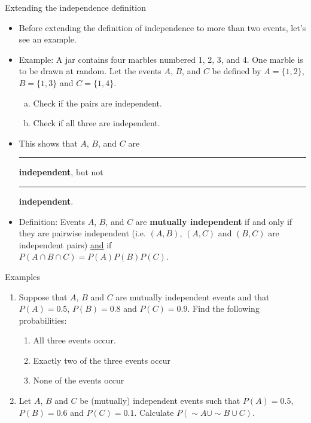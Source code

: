 \documentclass{article}
\newcommand{\blankul}[1]{\rule[-1.5mm]{#1}{0.15mm}}	%
\newcommand{\comp}{{\sim}}						%
\begin{document}
Extending the independence definition
\begin{itemize}
    \item Before extending the definition of independence to more than two events, let's see an example.
    \item Example: A jar contains four marbles numbered 1, 2, 3, and 4. One marble is to be drawn at random. Let the events $A$, $B$, and $C$ be defined by $A = \{1, 2\}$, $B = \{1, 3\}$ and $C = \{1, 4\}$.
    \begin{enumerate}[(a)]
        \item Check if the pairs are independent.\vspace{100pt}
        \item Check if all three are independent.\vspace{80pt}
    \end{enumerate}
    \item[] This shows that $A$, $B$, and $C$ are \blankul{2.5cm} \textbf{independent}, but not \blankul{2.5cm} \textbf{independent}.\bigskip
    \item Definition: Events $A$, $B$, and $C$ are \textbf{mutually independent} if and only if they are pairwise independent (i.e. $(A, B)$, $(A, C)$ and $(B, C)$ are independent pairs) \ul{and} if \\$P(A \cap B \cap C) = P(A) P(B) P(C)$.
\end{itemize}\newpage

Examples\bigskip
\begin{enumerate}
    \item Suppose that $A$, $B$ and $C$ are mutually independent events and that $P(A) = 0.5$, $P(B) = 0.8$ and $P(C) = 0.9$. Find the following probabilities:
    \begin{enumerate}
        \item All three events occur.\vspace{40pt}
        \item Exactly two of the three events occur\vspace{120pt}
        \item None of the events occur\vspace{140pt}
    \end{enumerate}
    \item Let $A$, $B$ and $C$ be (mutually) independent events such that $P(A) = 0.5$, $P(B) = 0.6$ and $P(C) = 0.1$. Calculate $P(\comp{A} \cup \comp{B} \cup C)$.\vspace{140pt}    
\end{enumerate}
\end{document}

